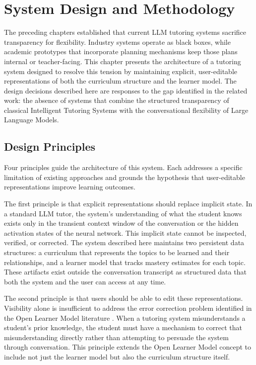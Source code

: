 \documentclass[logo,bsc,singlespacing,parskip,online]{infthesis}
\begin{document}
\chapter{System Design and Methodology}

The preceding chapters established that current LLM tutoring systems sacrifice transparency for flexibility. Industry systems operate as black boxes, while academic prototypes that incorporate planning mechanisms keep those plans internal or teacher-facing. This chapter presents the architecture of a tutoring system designed to resolve this tension by maintaining explicit, user-editable representations of both the curriculum structure and the learner model. The design decisions described here are responses to the gap identified in the related work: the absence of systems that combine the structured transparency of classical Intelligent Tutoring Systems with the conversational flexibility of Large Language Models.

\section{Design Principles}

Four principles guide the architecture of this system. Each addresses a specific limitation of existing approaches and grounds the hypothesis that user-editable representations improve learning outcomes.

The first principle is that explicit representations should replace implicit state. In a standard LLM tutor, the system's understanding of what the student knows exists only in the transient context window of the conversation or the hidden activation states of the neural network. This implicit state cannot be inspected, verified, or corrected. The system described here maintains two persistent data structures: a curriculum that represents the topics to be learned and their relationships, and a learner model that tracks mastery estimates for each topic. These artifacts exist outside the conversation transcript as structured data that both the system and the user can access at any time.

The second principle is that users should be able to edit these representations. Visibility alone is insufficient to address the error correction problem identified in the Open Learner Model literature \citep{bull2010olm}. When a tutoring system misunderstands a student's prior knowledge, the student must have a mechanism to correct that misunderstanding directly rather than attempting to persuade the system through conversation. This principle extends the Open Learner Model concept to include not just the learner model but also the curriculum structure itself.
\end{document}
